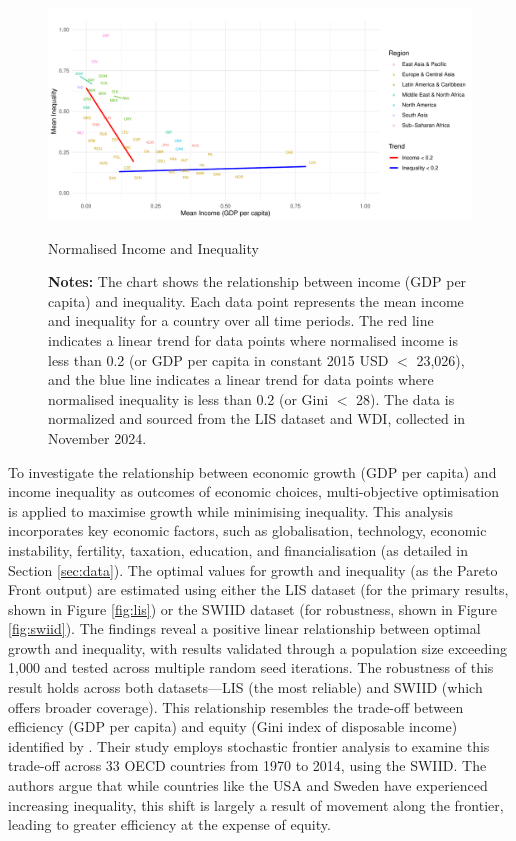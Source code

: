 \begin{figure}[h!]
    \centering
	\includegraphics[width=1\linewidth]{figs/trends.pdf}
    \caption{Normalised Income and Inequality}
    \label{fig:trend}
    \captionsetup{font=footnotesize}
    \caption*{\textbf{Notes:} The chart shows the relationship between income (GDP per capita) and inequality. Each data point represents the mean income and inequality for a country over all time periods. The red line indicates a linear trend for data points where normalised income is less than 0.2 (or GDP per capita in constant 2015 USD $<$ 23,026), and the blue line indicates a linear trend for data points where normalised inequality is less than 0.2 (or Gini $<$ 28). The data is normalized and sourced from the LIS dataset and WDI, collected in November 2024.}
\end{figure}


To investigate the relationship between economic growth (GDP per capita) and income inequality as outcomes of economic choices, multi-objective optimisation is applied to maximise growth while minimising inequality. This analysis incorporates key economic factors, such as globalisation, technology, economic instability, fertility, taxation, education, and financialisation (as detailed in Section \ref{sec:data}). The optimal values for growth and inequality (as the Pareto Front output) are estimated using either the LIS dataset (for the primary results, shown in Figure \ref{fig:lis}) or the SWIID dataset (for robustness, shown in Figure \ref{fig:swiid}). The findings reveal a positive linear relationship between optimal growth and inequality, with results validated through a population size exceeding 1,000 and tested across multiple random seed iterations. The robustness of this result holds across both datasets—LIS (the most reliable) and SWIID (which offers broader coverage). This relationship resembles the trade-off between efficiency (GDP per capita) and equity (Gini index of disposable income) identified by \textcite{andersen2020big}. Their study employs stochastic frontier analysis to examine this trade-off across 33 OECD countries from 1970 to 2014, using the SWIID. The authors argue that while countries like the USA and Sweden have experienced increasing inequality, this shift is largely a result of movement along the frontier, leading to greater efficiency at the expense of equity.


